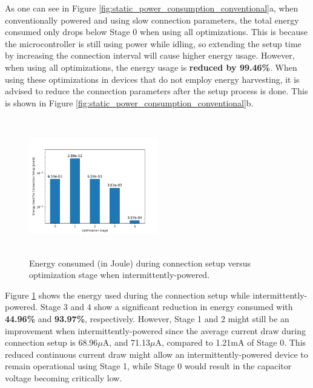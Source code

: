 As one can see in Figure \ref{fig:static_power_consumption_conventional}a, when conventionally powered and using slow connection parameters, the total energy consumed only drops below Stage 0 when using all optimizations. This is because the microcontroller is still using power while idling, so extending the setup time by increasing the connection interval will cause higher energy usage. However, when using all optimizations, the energy usage is \textbf{reduced by 99.46\%}. When using these optimizations in devices that do not employ energy harvesting, it is advised to reduce the connection parameters after the setup process is done. This is shown in Figure \ref{fig:static_power_consumption_conventional}b.

\begin{figure}[]
    \centering
    \includegraphics[width=0.5\textwidth,height=6cm,keepaspectratio=true]{plots/static_power_consumption_intermittent.png}
    \caption{
        Energy consumed (in Joule) during connection setup versus optimization stage when intermittently-powered. 
    }
    \label{fig:static_power_consumption_intermittent}
\end{figure}

Figure \ref{fig:static_power_consumption_intermittent} shows the energy used during the connection setup while intermittently-powered. Stage 3 and 4 show a significant reduction in energy consumed with \textbf{44.96\%} and \textbf{93.97\%}, respectively. However, Stage 1 and 2 might still be an improvement when intermittently-powered since the average current draw during connection setup is 68.96$\mu$A, and 71.13$\mu$A, compared to 1.21mA of Stage 0. This reduced continuous current draw might allow an intermittently-powered device to remain operational using Stage 1, while Stage 0 would result in the capacitor voltage becoming critically low.

